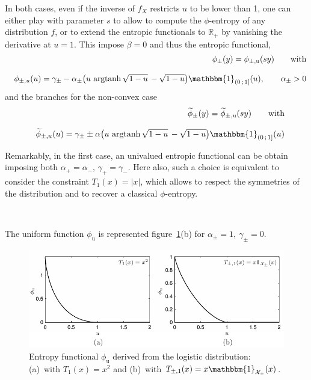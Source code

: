 \documentclass[entropy,article,submit,moreauthors,pdftex]{Definitions/mdpi}
\def\Rset{\mathbb{R}}%
\def\X{\mathcal{X}}%
\def\un{\mathbbm{1}}%
\def\argtanh{\operatorname{argtanh}}%
\def\u{\mathrm{u}}
\begin{document}
In both cases,  even if the inverse of  $f_X$ restricts $u$ to be  lower than 1,
one can either play with parameter $s$ to allow to compute the $\phi$-entropy of
any distribution  $f$, or  to extend  the entropic  functionals to  $\Rset_+$ by
vanishing the  derivative at  $u =  1$.  This impose  $\beta =  0$ and  thus the
entropic functional,
%
\begin{eqnarray*}
  &&\phi_\pm(y)  =  \phi_{\pm,\u}(s  y) \qquad \mbox{with}
  \\[2.5mm]
  && \phi_{\pm,u}(u) = \gamma_\pm - \alpha_\pm \left( u \, \argtanh\sqrt{1-u} \,
  - \sqrt{1-u} \right) \un_{\left( 0 \, ; \, 1 \right]}(u), \qquad \alpha_\pm >
    0
\end{eqnarray*}
%
and the branches for the non-convex case
%
\begin{eqnarray*}
  && \widetilde{\phi}_\pm(y) = \widetilde{\phi}_{\pm,\u}(s y) \qquad \mbox{with}
  \\[2.5mm]
  &&\widetilde{\phi}_{\pm,u}(u) = \gamma_\pm \pm \alpha \left( u \,
  \argtanh\sqrt{1-u} \, - \sqrt{1-u} \right) \un_{\left( 0 \, ; \, 1 \right]}(u)
\end{eqnarray*}


Remarkably, in  the first case, an  univalued entropic functional can  be obtain
imposing both $\alpha_+ = \alpha_-, \,  \gamma_+ = \gamma_-$.  Here also, such a
choice is equivalent to consider the  constraint $T_1(x) = |x|$, which allows to
respect  the  symmetries  of  the   distribution  and  to  recover  a  classical
$\phi$-entropy.

\

The        uniform        function        $\phi_\u$        is        represented
figure~\ref{fig:Entropy-logistic}(b) for $\alpha_\pm = 1, \: \gamma_\pm = 0$.

\begin{figure}[htbp]
\centerline{\includegraphics[width=\columnwidth]{PDF/MaxEnt_LogisticLaw}}
\caption{Entropy functional  $\phi_\u$ derived  from the  logistic distribution:
  (a)~with $T_1(x) = x^2$ and (b)~with $T_{\pm,1}(x) = x \un_{\X_\pm}(x)$.}
\label{fig:Entropy-logistic}
\end{figure}
\end{document}
